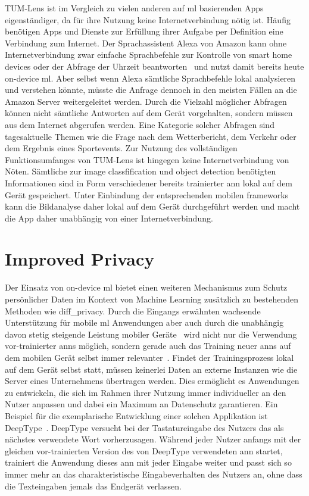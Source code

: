 \documentclass[
			   fontsize=11pt,
               paper=a4,
               bibliography=totoc,
               idxtotoc,
               headsepline,
               footsepline,
               footinclude=false,
               BCOR=12mm,
               DIV=13,
               openany,   %
               ]
               {scrbook}
\begin{document}
TUM-Lens ist im Vergleich zu vielen anderen auf \acrlong{ml} basierenden Apps eigenständiger, da für ihre Nutzung keine Internetverbindung nötig ist. Häufig benötigen Apps und Dienste zur Erfüllung ihrer Aufgabe per Definition eine Verbindung zum Internet. Der Sprachassistent Alexa von Amazon kann ohne Internetverbindung zwar einfache Sprachbefehle zur Kontrolle von smart home devices oder der Abfrage der Uhrzeit beantworten~\cite{azn_local} und nutzt damit bereits heute on-device \acrlong{ml}. Aber selbst wenn Alexa sämtliche Sprachbefehle lokal analysieren und verstehen könnte, müsste die Anfrage dennoch in den meisten Fällen an die Amazon Server weitergeleitet werden. Durch die Vielzahl möglicher Abfragen können nicht sämtliche Antworten auf dem Gerät vorgehalten, sondern müssen aus dem Internet abgerufen werden. Eine Kategorie solcher Abfragen sind tagesaktuelle Themen wie die Frage nach dem Wetterbericht, dem Verkehr oder dem Ergebnis eines Sportevents. Zur Nutzung des vollständigen Funktionsumfanges von TUM-Lens ist hingegen keine Internetverbindung von Nöten. Sämtliche zur image classfification und object detection benötigten Informationen sind in Form verschiedener bereits trainierter \gls{ann} lokal auf dem Gerät gespeichert. Unter Einbindung der entsprechenden mobilen frameworks kann die Bildanalyse daher lokal auf dem Gerät durchgeführt werden und macht die App daher unabhängig von einer Internetverbindung.

\section{Improved Privacy}

Der Einsatz von on-device \gls{ml} bietet einen weiteren Mechanismus zum Schutz persönlicher Daten im Kontext von Machine Learning zusätzlich zu bestehenden Methoden wie \gls{diff_privacy}. Durch die Eingangs erwähnten wachsende Unterstützung für mobile \gls{ml} Anwendungen aber auch durch die unabhängig davon stetig steigende Leistung mobiler Geräte~\cite{mobile_cpu_power} wird nicht nur die Verwendung vor-trainierter \glspl{ann} möglich, sondern gerade auch das Training neuer \glspl{ann} auf dem mobilen Gerät selbst immer relevanter~\cite{liu19}. Findet der Trainingsprozess lokal auf dem Gerät selbst statt, müssen keinerlei Daten an externe Instanzen wie die Server eines Unternehmens übertragen werden. Dies ermöglicht es Anwendungen zu entwickeln, die sich im Rahmen ihrer Nutzung immer individueller an den Nutzer anpassen und dabei ein Maximum an Datenschutz garantieren. Ein Beispiel für die exemplarische Entwicklung einer solchen Applikation ist DeepType~\cite{deepType}. DeepType versucht bei der Tastatureingabe des Nutzers das als nächstes verwendete Wort vorherzusagen. Während jeder Nutzer anfangs mit der gleichen vor-trainierten Version des von DeepType verwendeten \gls{ann} startet, trainiert die Anwendung dieses \gls{ann} mit jeder Eingabe weiter und passt sich so immer mehr an das charakteristische Eingabeverhalten des Nutzers an, ohne dass die Texteingaben jemals das Endgerät verlassen.
\end{document}
